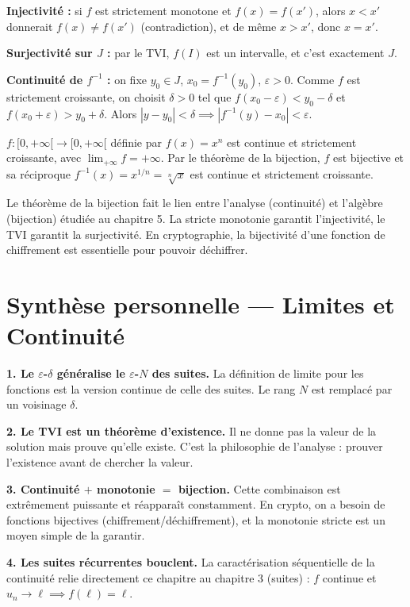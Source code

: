 \begin{proofbox}
\textbf{Injectivité :} si $f$ est strictement monotone et $f(x) = f(x')$, alors $x < x'$ donnerait $f(x) \neq f(x')$ (contradiction), et de même $x > x'$, donc $x = x'$.

\textbf{Surjectivité sur $J$ :} par le TVI, $f(I)$ est un intervalle, et c'est exactement $J$.

\textbf{Continuité de $f^{-1}$ :} on fixe $y_0 \in J$, $x_0 = f^{-1}(y_0)$, $\varepsilon > 0$. Comme $f$ est strictement croissante, on choisit $\delta > 0$ tel que $f(x_0 - \varepsilon) < y_0 - \delta$ et $f(x_0 + \varepsilon) > y_0 + \delta$. Alors $|y - y_0| < \delta \implies |f^{-1}(y) - x_0| < \varepsilon$.
\end{proofbox}

\begin{exbox}
$f : [0, +\infty[ \to [0, +\infty[$ définie par $f(x) = x^n$ est continue et strictement croissante, avec $\lim_{+\infty} f = +\infty$. Par le théorème de la bijection, $f$ est bijective et sa réciproque $f^{-1}(x) = x^{1/n} = \sqrt[n]{x}$ est continue et strictement croissante.
\end{exbox}

\begin{intuitionbox}
Le théorème de la bijection fait le lien entre l'analyse (continuité) et l'algèbre (bijection) étudiée au chapitre 5. La stricte monotonie garantit l'injectivité, le TVI garantit la surjectivité. En cryptographie, la bijectivité d'une fonction de chiffrement est essentielle pour pouvoir déchiffrer.
\end{intuitionbox}


\section{Synthèse personnelle --- Limites et Continuité}

\begin{intuitionbox}
\textbf{1. Le $\varepsilon$-$\delta$ généralise le $\varepsilon$-$N$ des suites.} La définition de limite pour les fonctions est la version continue de celle des suites. Le rang $N$ est remplacé par un voisinage $\delta$.

\textbf{2. Le TVI est un théorème d'existence.} Il ne donne pas la valeur de la solution mais prouve qu'elle existe. C'est la philosophie de l'analyse : prouver l'existence avant de chercher la valeur.

\textbf{3. Continuité $+$ monotonie $=$ bijection.} Cette combinaison est extrêmement puissante et réapparaît constamment. En crypto, on a besoin de fonctions bijectives (chiffrement/déchiffrement), et la monotonie stricte est un moyen simple de la garantir.

\textbf{4. Les suites récurrentes bouclent.} La caractérisation séquentielle de la continuité relie directement ce chapitre au chapitre 3 (suites) : $f$ continue et $u_n \to \ell \implies f(\ell) = \ell$.
\end{intuitionbox}


